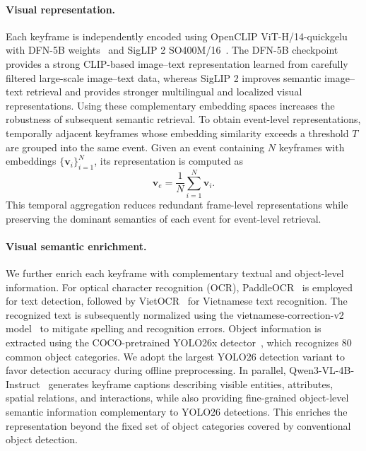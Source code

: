 \documentclass[runningheads]{llncs}
\begin{document}
\paragraph{Visual representation.}
Each keyframe is independently encoded using OpenCLIP ViT-H/14-quickgelu with DFN-5B weights~\cite{ilharco2021openclip,fang2024dfn} and SigLIP 2 SO400M/16~\cite{tschannen2025siglip2}. The DFN-5B checkpoint provides a strong CLIP-based image--text representation learned from carefully filtered large-scale image--text data, whereas SigLIP 2 improves semantic image--text retrieval and provides stronger multilingual and localized visual representations. Using these complementary embedding spaces increases the robustness of subsequent semantic retrieval. To obtain event-level representations, temporally adjacent keyframes whose embedding similarity exceeds a threshold $T$ are grouped into the same event. Given an event containing $N$ keyframes with embeddings $\{\mathbf{v}_i\}_{i=1}^{N}$, its representation is computed as
\begin{equation}
    \mathbf{v}_{e}=\frac{1}{N}\sum_{i=1}^{N}\mathbf{v}_{i}.
\end{equation}
This temporal aggregation reduces redundant frame-level representations while preserving the dominant semantics of each event for event-level retrieval.

\paragraph{Visual semantic enrichment.}
We further enrich each keyframe with complementary textual and object-level information. For optical character recognition (OCR), PaddleOCR~\cite{du2020ppocr} is employed for text detection, followed by VietOCR~\cite{vietocr} for Vietnamese text recognition. The recognized text is subsequently normalized using the vietnamese-correction-v2 model~\cite{vietnameseCorrectionV2} to mitigate spelling and recognition errors. Object information is extracted using the COCO-pretrained YOLO26x detector~\cite{jocher2026yolo26}, which recognizes 80 common object categories. We adopt the largest YOLO26 detection variant to favor detection accuracy during offline preprocessing. In parallel, Qwen3-VL-4B-Instruct~\cite{bai2025qwen3vl} generates keyframe captions describing visible entities, attributes, spatial relations, and interactions, while also providing fine-grained object-level semantic information complementary to YOLO26 detections. This enriches the representation beyond the fixed set of object categories covered by conventional object detection.
\end{document}
